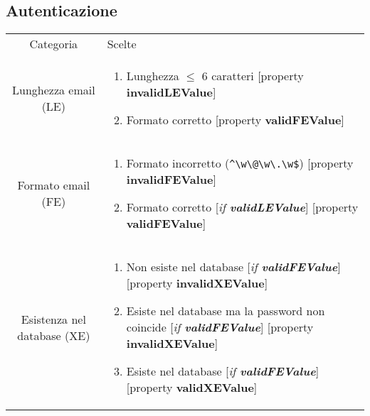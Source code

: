 \documentclass[12pt]{article}
\begin{document}
\newpage

\subsection{Autenticazione}
\begin{center}
\begin{tabular}{|c|l|}
\hline
\rowcolor[HTML]{C0C0C0} 
\multicolumn{2}{|c|}{\cellcolor[HTML]{C0C0C0}Parametro: Email} \\ \hline
\rowcolor[HTML]{C0C0C0} 
\cellcolor[HTML]{C0C0C0}Categoria & Scelte \\ \hline

Lunghezza email (LE) & \begin{minipage}{10cm}
\begin{enumerate}
\item Lunghezza $\leq$ 6 caratteri [property \textbf{invalidLEValue}]
\item Formato corretto [property \textbf{validFEValue}]
\end{enumerate}
\end{minipage} \\ \hline

Formato email (FE) & \begin{minipage}{10cm}
\begin{enumerate}
\item Formato incorretto (\verb+^\w\@\w\.\w$+) [property \textbf{invalidFEValue}]
\item Formato corretto [\emph{if \textbf{validLEValue}}] [property \textbf{validFEValue}]
\end{enumerate}
\end{minipage} \\ \hline

Esistenza nel database (XE) & \begin{minipage}{10cm}
\begin{enumerate}
\item Non esiste nel database [\emph{if \textbf{validFEValue}}] [property \textbf{invalidXEValue}]
\item Esiste nel database ma la password non coincide [\emph{if \textbf{validFEValue}}] [property \textbf{invalidXEValue}]
\item Esiste nel database [\emph{if \textbf{validFEValue}}] [property \textbf{validXEValue}]
\end{enumerate}
\end{minipage} \\ \hline

\end{tabular}
\end{center}
\end{document}
